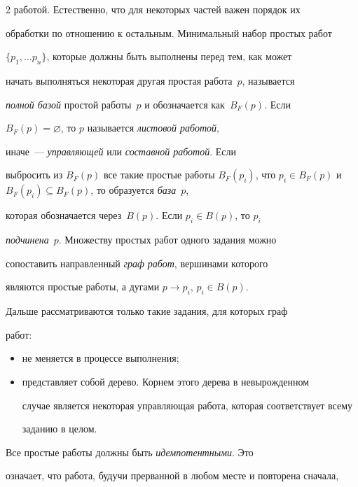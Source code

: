 \begin{multicols}{2}
{работой}. Естественно, что для некоторых частей важен порядок их 


обработки по отношению к остальным. Минимальный набор простых работ 


$\{p_1, \ldots  p_n\}$, которые должны быть выполнены перед тем, как может 


начать выполняться некоторая другая простая работа~$p$, называется 


\textit{полной базой} простой работы~$p$ и обозначается как~$B_F(p)$. Если 


$B_F(p)=\varnothing$, то $p$ называется \textit{листовой работой}, 


      иначе~--- \textit{управляющей} или \textit{составной работой}. Если 


выбросить из $B_F(p)$ все такие простые работы $B_F(p_i)$, что $p_i\in 


B_F(p)$ и $B_F(p_i)\subseteq B_F(p)$, то образуется \textit{база}~$p$, 


которая обозначается через~$B(p)$. Если $p_i\in B(p)$, то $p_i$ 


\textit{подчинена}~$p$. Множеству простых работ одного задания можно 


сопоставить направленный \textit{граф работ}, вершинами которого 


являются простые работы, а дугами $p\rightarrow p_i$, $p_i\in B(p)$.


      


      Дальше рассматриваются только такие задания, для которых граф 


работ:


      \begin{itemize}


      \item не меняется в процессе выполнения;


\item представляет собой дерево. Корнем этого дерева в невырожденном 


случае является некоторая управляющая работа, которая соответствует всему 


заданию в целом.


\end{itemize}





     Все простые работы должны быть \textit{идемпотентными}. Это 


означает, что работа, будучи прерванной в любом месте и повторена сначала, 



\end{multicols}
